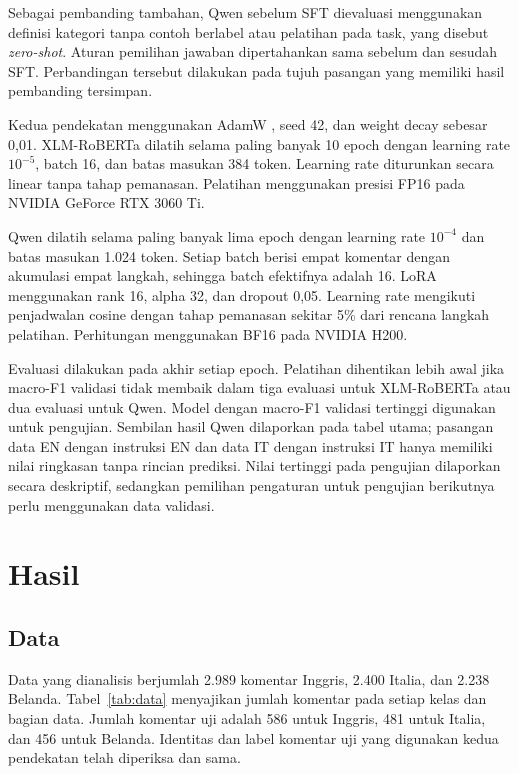 \documentclass[11pt]{article}
\begin{document}
Sebagai pembanding tambahan, Qwen sebelum SFT dievaluasi menggunakan definisi kategori tanpa contoh berlabel atau pelatihan pada task, yang disebut \textit{zero-shot}. Aturan pemilihan jawaban dipertahankan sama sebelum dan sesudah SFT. Perbandingan tersebut dilakukan pada tujuh pasangan yang memiliki hasil pembanding tersimpan.

Kedua pendekatan menggunakan AdamW \citep{loshchilov-hutter-2019-decoupled}, seed 42, dan weight decay sebesar 0,01. XLM-RoBERTa dilatih selama paling banyak 10 epoch dengan learning rate $10^{-5}$, batch 16, dan batas masukan 384 token. Learning rate diturunkan secara linear tanpa tahap pemanasan. Pelatihan menggunakan presisi FP16 pada NVIDIA GeForce RTX 3060 Ti.

Qwen dilatih selama paling banyak lima epoch dengan learning rate $10^{-4}$ dan batas masukan 1.024 token. Setiap batch berisi empat komentar dengan akumulasi empat langkah, sehingga batch efektifnya adalah 16. LoRA menggunakan rank 16, alpha 32, dan dropout 0,05. Learning rate mengikuti penjadwalan cosine dengan tahap pemanasan sekitar 5\% dari rencana langkah pelatihan. Perhitungan menggunakan BF16 pada NVIDIA H200.

Evaluasi dilakukan pada akhir setiap epoch. Pelatihan dihentikan lebih awal jika macro-F1 validasi tidak membaik dalam tiga evaluasi untuk XLM-RoBERTa atau dua evaluasi untuk Qwen. Model dengan macro-F1 validasi tertinggi digunakan untuk pengujian. Sembilan hasil Qwen dilaporkan pada tabel utama; pasangan data EN dengan instruksi EN dan data IT dengan instruksi IT hanya memiliki nilai ringkasan tanpa rincian prediksi. Nilai tertinggi pada pengujian dilaporkan secara deskriptif, sedangkan pemilihan pengaturan untuk pengujian berikutnya perlu menggunakan data validasi.

\section{Hasil}
\subsection{Data}
Data yang dianalisis berjumlah 2.989 komentar Inggris, 2.400 Italia, dan 2.238 Belanda. Tabel~\ref{tab:data} menyajikan jumlah komentar pada setiap kelas dan bagian data. Jumlah komentar uji adalah 586 untuk Inggris, 481 untuk Italia, dan 456 untuk Belanda. Identitas dan label komentar uji yang digunakan kedua pendekatan telah diperiksa dan sama.
\end{document}
